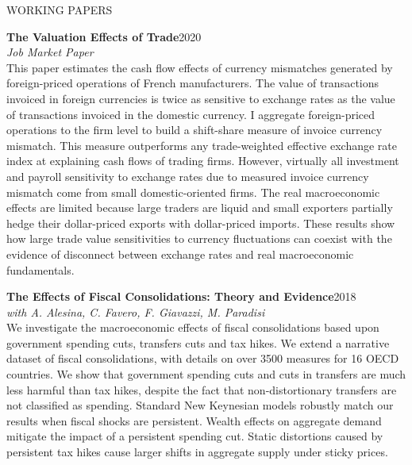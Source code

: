 \documentclass{resume} %
\begin{document}
\begin{rSection}{WORKING PAPERS}

{\textbf{The Valuation Effects of Trade}\hfill{2020}}\\\textit{Job Market Paper}\\
{This paper estimates the cash flow effects of currency mismatches generated by foreign-priced operations of French manufacturers. The value of transactions invoiced in foreign currencies is twice as sensitive to exchange rates as the value of transactions invoiced in the domestic currency. I aggregate foreign-priced operations to the firm level to build a shift-share measure of invoice currency mismatch. This measure outperforms any trade-weighted effective exchange rate index at explaining cash flows of trading firms. However, virtually all investment and payroll sensitivity to exchange rates due to measured invoice currency mismatch come from small domestic-oriented firms. The real macroeconomic effects are limited because large traders are liquid and small exporters partially hedge their dollar-priced exports with dollar-priced imports. These results show how large trade value sensitivities to currency fluctuations can coexist with the evidence of disconnect between exchange rates and real macroeconomic fundamentals.}


\bigskip

\textbf{The Effects of Fiscal Consolidations: Theory and Evidence}\hfill2018\\
\textit{with A. Alesina, C. Favero, F. Giavazzi, M. Paradisi}\\
{We investigate the macroeconomic effects of fiscal consolidations based upon government spending cuts, transfers cuts and tax hikes. We extend a narrative dataset of fiscal consolidations, with details on over 3500 measures for 16 OECD countries. We show that government spending cuts and cuts in transfers are 	much less harmful than tax hikes, despite the fact that non-distortionary transfers are not classified as spending. Standard New Keynesian models robustly match our results when fiscal shocks are persistent. 	Wealth effects on aggregate demand mitigate the impact of a persistent spending cut. Static distortions caused by persistent tax hikes cause larger shifts in aggregate supply under sticky prices.}

\end{rSection} 



\end{document}
